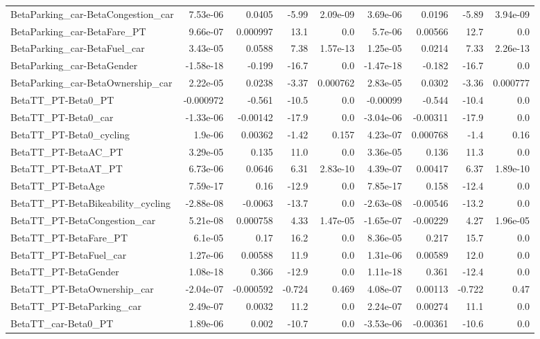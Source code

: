 \begin{tabular}{lrrrrrrrr}
BetaParking_car-BetaCongestion_car & 7.53e-06 & 0.0405 & -5.99 & 2.09e-09 & 3.69e-06 & 0.0196 & -5.89 & 3.94e-09 \\
BetaParking_car-BetaFare_PT & 9.66e-07 & 0.000997 & 13.1 & 0.0 & 5.7e-06 & 0.00566 & 12.7 & 0.0 \\
BetaParking_car-BetaFuel_car & 3.43e-05 & 0.0588 & 7.38 & 1.57e-13 & 1.25e-05 & 0.0214 & 7.33 & 2.26e-13 \\
BetaParking_car-BetaGender & -1.58e-18 & -0.199 & -16.7 & 0.0 & -1.47e-18 & -0.182 & -16.7 & 0.0 \\
BetaParking_car-BetaOwnership_car & 2.22e-05 & 0.0238 & -3.37 & 0.000762 & 2.83e-05 & 0.0302 & -3.36 & 0.000777 \\
BetaTT_PT-Beta0_PT & -0.000972 & -0.561 & -10.5 & 0.0 & -0.00099 & -0.544 & -10.4 & 0.0 \\
BetaTT_PT-Beta0_car & -1.33e-06 & -0.00142 & -17.9 & 0.0 & -3.04e-06 & -0.00311 & -17.9 & 0.0 \\
BetaTT_PT-Beta0_cycling & 1.9e-06 & 0.00362 & -1.42 & 0.157 & 4.23e-07 & 0.000768 & -1.4 & 0.16 \\
BetaTT_PT-BetaAC_PT & 3.29e-05 & 0.135 & 11.0 & 0.0 & 3.36e-05 & 0.136 & 11.3 & 0.0 \\
BetaTT_PT-BetaAT_PT & 6.73e-06 & 0.0646 & 6.31 & 2.83e-10 & 4.39e-07 & 0.00417 & 6.37 & 1.89e-10 \\
BetaTT_PT-BetaAge & 7.59e-17 & 0.16 & -12.9 & 0.0 & 7.85e-17 & 0.158 & -12.4 & 0.0 \\
BetaTT_PT-BetaBikeability_cycling & -2.88e-08 & -0.0063 & -13.7 & 0.0 & -2.63e-08 & -0.00546 & -13.2 & 0.0 \\
BetaTT_PT-BetaCongestion_car & 5.21e-08 & 0.000758 & 4.33 & 1.47e-05 & -1.65e-07 & -0.00229 & 4.27 & 1.96e-05 \\
BetaTT_PT-BetaFare_PT & 6.1e-05 & 0.17 & 16.2 & 0.0 & 8.36e-05 & 0.217 & 15.7 & 0.0 \\
BetaTT_PT-BetaFuel_car & 1.27e-06 & 0.00588 & 11.9 & 0.0 & 1.31e-06 & 0.00589 & 12.0 & 0.0 \\
BetaTT_PT-BetaGender & 1.08e-18 & 0.366 & -12.9 & 0.0 & 1.11e-18 & 0.361 & -12.4 & 0.0 \\
BetaTT_PT-BetaOwnership_car & -2.04e-07 & -0.000592 & -0.724 & 0.469 & 4.08e-07 & 0.00113 & -0.722 & 0.47 \\
BetaTT_PT-BetaParking_car & 2.49e-07 & 0.0032 & 11.2 & 0.0 & 2.24e-07 & 0.00274 & 11.1 & 0.0 \\
BetaTT_car-Beta0_PT & 1.89e-06 & 0.002 & -10.7 & 0.0 & -3.53e-06 & -0.00361 & -10.6 & 0.0 \\

\end{tabular}
